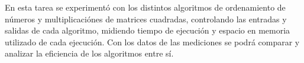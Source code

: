 
En esta tarea se experimentó con los distintos algoritmos de ordenamiento de números y multiplicaciónes de matrices cuadradas, controlando las entradas y salidas de cada algoritmo, midiendo tiempo de ejecución y espacio en memoria utilizado de cada ejecución. Con los datos de las mediciones se podrá comparar y analizar la eficiencia de los algoritmos entre sí. 